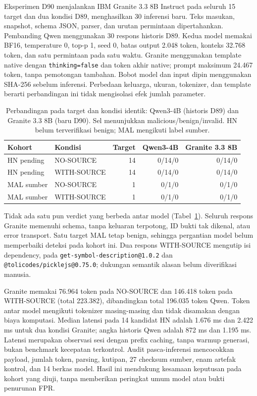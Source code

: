 Eksperimen D90 menjalankan IBM Granite 3.3 8B Instruct pada seluruh 15
target dan dua kondisi D89, menghasilkan 30 inferensi baru. Teks masukan,
snapshot, schema JSON, parser, dan urutan permintaan dipertahankan.
Pembanding Qwen menggunakan 30 respons historis D89. Kedua model memakai
BF16, temperature 0, top-p 1, seed 0, batas output 2.048 token, konteks
32.768 token, dan satu permintaan pada satu waktu. Granite menggunakan
template native dengan \texttt{thinking=false} dan token akhir native;
prompt maksimum 24.467 token, tanpa pemotongan tambahan. Bobot model dan
input dipin menggunakan SHA-256 sebelum inferensi. Perbedaan keluarga,
ukuran, tokenizer, dan template berarti perbandingan ini tidak mengisolasi
efek jumlah parameter.

\begin{table}[t]
\caption{Perbandingan pada target dan kondisi identik: Qwen3-4B (historis
D89) dan Granite 3.3 8B (baru D90). Sel menunjukkan malicious/benign/invalid.
HN belum terverifikasi benign; MAL mengikuti label sumber.}
\label{tab:granite-comparison}
\centering
\begin{tabular}{llrrr}
\toprule
Kohort & Kondisi & Target & Qwen3-4B & Granite 3.3 8B \\
\midrule
HN pending & NO-SOURCE & 14 & 0/14/0 & 0/14/0 \\
HN pending & WITH-SOURCE & 14 & 0/14/0 & 0/14/0 \\
MAL sumber & NO-SOURCE & 1 & 0/1/0 & 0/1/0 \\
MAL sumber & WITH-SOURCE & 1 & 0/1/0 & 0/1/0 \\
\bottomrule
\end{tabular}
\end{table}

Tidak ada satu pun verdict yang berbeda antar model
(Tabel~\ref{tab:granite-comparison}). Seluruh respons Granite memenuhi
schema, tanpa keluaran terpotong, ID bukti tak dikenal, atau error transport.
Satu target MAL tetap benign, sehingga pergantian model belum memperbaiki
deteksi pada kohort ini. Dua respons WITH-SOURCE mengutip isi dependency,
pada \texttt{get-symbol-description@1.0.2} dan
\texttt{@tolicodes/picklejs@0.75.0}; dukungan semantik alasan belum
diverifikasi manusia.

Granite memakai 76.964 token pada NO-SOURCE dan 146.418 token pada
WITH-SOURCE (total 223.382), dibandingkan total 196.035 token Qwen.
Token antar model mengikuti tokenizer masing-masing dan tidak disamakan
dengan biaya komputasi. Median latensi pada 14 kandidat HN adalah 1.676 ms
dan 2.422 ms untuk dua kondisi Granite; angka historis Qwen adalah
872 ms dan 1.195 ms. Latensi merupakan observasi sesi dengan prefix caching,
tanpa warmup generasi, bukan benchmark kecepatan terkontrol. Audit
pasca-inferensi mencocokkan payload, jumlah token, parsing, kutipan,
27 checksum sumber, enam artefak kontrol, dan 14 berkas model. Hasil ini
mendukung kesamaan keputusan pada kohort yang diuji, tanpa memberikan
peringkat umum model atau bukti penurunan FPR.
